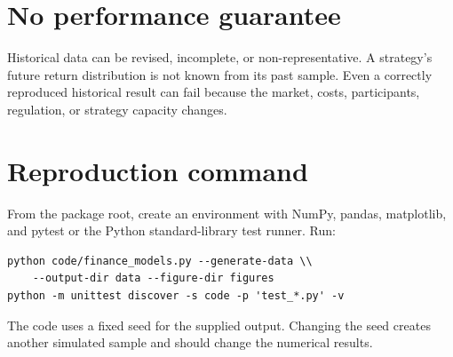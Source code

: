 \section{No performance guarantee}
Historical data can be revised, incomplete, or non-representative. A strategy's future return distribution is not known from its past sample. Even a correctly reproduced historical result can fail because the market, costs, participants, regulation, or strategy capacity changes.

\section{Reproduction command}
From the package root, create an environment with NumPy, pandas, matplotlib, and pytest or the Python standard-library test runner. Run:
\begin{verbatim}
python code/finance_models.py --generate-data \\
    --output-dir data --figure-dir figures
python -m unittest discover -s code -p 'test_*.py' -v
\end{verbatim}
The code uses a fixed seed for the supplied output. Changing the seed creates another simulated sample and should change the numerical results.
